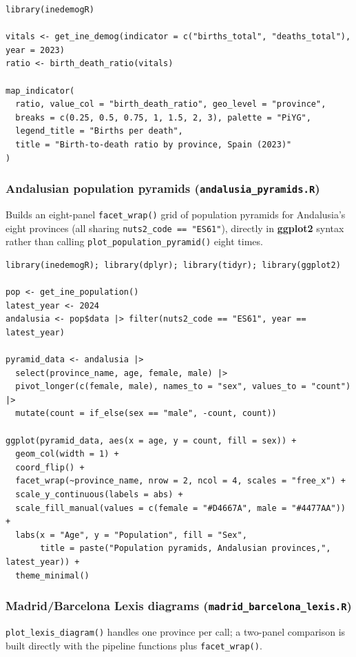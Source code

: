\documentclass[11pt]{article}
\newcommand{\pkg}[1]{\textbf{#1}}
\newcommand{\fn}[1]{\texttt{#1}}
\begin{document}
\begin{lstlisting}
library(inedemogR)

vitals <- get_ine_demog(indicator = c("births_total", "deaths_total"), year = 2023)
ratio <- birth_death_ratio(vitals)

map_indicator(
  ratio, value_col = "birth_death_ratio", geo_level = "province",
  breaks = c(0.25, 0.5, 0.75, 1, 1.5, 2, 3), palette = "PiYG",
  legend_title = "Births per death",
  title = "Birth-to-death ratio by province, Spain (2023)"
)
\end{lstlisting}

\subsubsection{Andalusian population pyramids (\fn{andalusia\_pyramids.R})}

Builds an eight-panel \fn{facet\_wrap()} grid of population pyramids for
Andalusia's eight provinces (all sharing \fn{nuts2\_code == "ES61"}),
directly in \pkg{ggplot2} syntax rather than calling
\fn{plot\_population\_pyramid()} eight times.

\begin{lstlisting}
library(inedemogR); library(dplyr); library(tidyr); library(ggplot2)

pop <- get_ine_population()
latest_year <- 2024
andalusia <- pop$data |> filter(nuts2_code == "ES61", year == latest_year)

pyramid_data <- andalusia |>
  select(province_name, age, female, male) |>
  pivot_longer(c(female, male), names_to = "sex", values_to = "count") |>
  mutate(count = if_else(sex == "male", -count, count))

ggplot(pyramid_data, aes(x = age, y = count, fill = sex)) +
  geom_col(width = 1) +
  coord_flip() +
  facet_wrap(~province_name, nrow = 2, ncol = 4, scales = "free_x") +
  scale_y_continuous(labels = abs) +
  scale_fill_manual(values = c(female = "#D4667A", male = "#4477AA")) +
  labs(x = "Age", y = "Population", fill = "Sex",
       title = paste("Population pyramids, Andalusian provinces,", latest_year)) +
  theme_minimal()
\end{lstlisting}

\subsubsection{Madrid/Barcelona Lexis diagrams (\fn{madrid\_barcelona\_lexis.R})}

\fn{plot\_lexis\_diagram()} handles one province per call; a two-panel
comparison is built directly with the pipeline functions plus
\fn{facet\_wrap()}.
\end{document}
